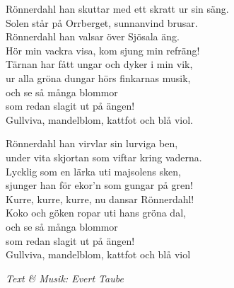 \vspace{10pt}
Rönnerdahl han skuttar med ett skratt ur sin säng.\\
Solen står på Orrberget, sunnanvind brusar.\\
Rönnerdahl han valsar över Sjösala äng.\\
Hör min vackra visa, kom sjung min refräng!\\
Tärnan har fått ungar och dyker i min vik,\\
ur alla gröna dungar hörs finkarnas musik,\\
och se så många blommor\\
som redan slagit ut på ängen!\\
Gullviva, mandelblom, kattfot och blå viol.\par
\vspace{10pt}
Rönnerdahl han virvlar sin lurviga ben,\\
under vita skjortan som viftar kring vaderna.\\
Lycklig som en lärka uti majsolens sken,\\
sjunger han för ekor'n som gungar på gren!\\
Kurre, kurre, kurre, nu dansar Rönnerdahl!\\
Koko och göken ropar uti hans gröna dal,\\
och se så många blommor\\
som redan slagit ut på ängen!\\
Gullviva, mandelblom, kattfot och blå viol
\par
\vspace{10pt}
{\footnotesize\textit{Text \& Musik: Evert Taube}}
